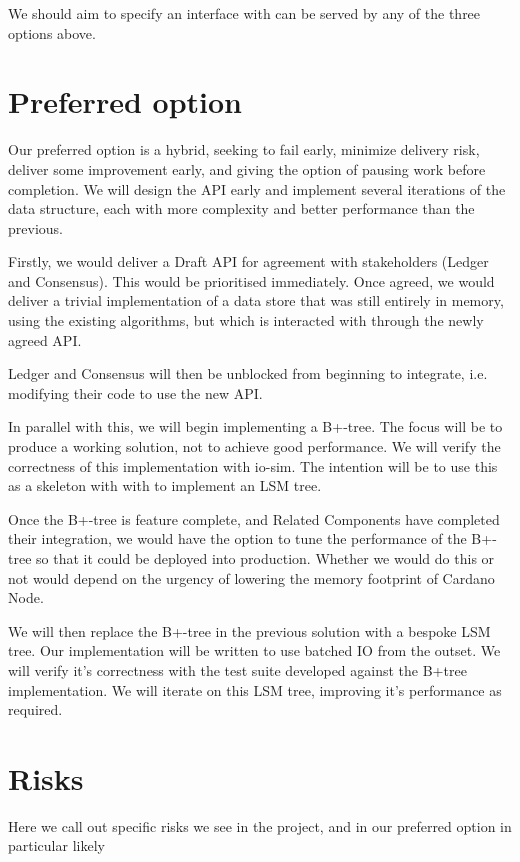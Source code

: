 \documentclass[11pt,a4paper]{article}
\begin{document}
We should aim to specify an interface with can be served by any of the three
options above.

\section{Preferred option}
\label{preferred}

Our preferred option is a hybrid, seeking to fail early, minimize delivery risk,
deliver some improvement early, and giving the option of pausing work before
completion. We will design the API early and implement several iterations of the
data structure, each with more complexity and better performance than the
previous.

Firstly, we would deliver a Draft API for agreement with stakeholders (Ledger
and Consensus). This would be prioritised immediately. Once agreed, we would
deliver a trivial implementation of a data store that was still entirely in
memory, using the existing algorithms, but which is interacted with through the
newly agreed API.

Ledger and Consensus will then be unblocked from beginning to integrate, i.e.
modifying their code to use the new API.

In parallel with this, we will begin implementing a B+-tree. The focus will
be to produce a working solution, not to achieve good performance. We
will verify the correctness of this implementation with io-sim. The intention
will be to use this as a skeleton with with to implement an LSM tree.

Once the B+-tree is feature complete, and Related Components have completed
their integration, we would have the option to tune the performance of the
B+-tree so that it could be deployed into production. Whether we would do this
or not would depend on the urgency of lowering the memory footprint of Cardano
Node.

We will then replace the B+-tree in the previous solution with a bespoke LSM tree.
Our implementation will be written to use batched IO from the outset. We will
verify it's correctness with the test suite developed against the B+tree
implementation. We will iterate on this LSM tree, improving it's performance
as required.

\section{Risks}

Here we call out specific risks we see in the project, and in our preferred option in particular
likely
\end{document}
